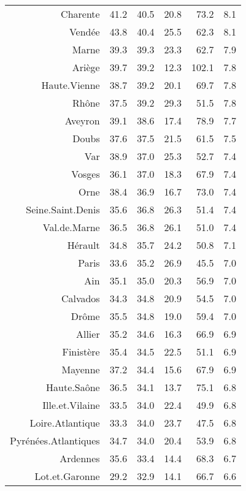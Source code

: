 \documentclass[11pt,a4paper]{article}\usepackage[]{graphicx}\usepackage[]{color}
\begin{document}
\begin{table}[H]
\begin{tabular}{rrrrrr}
  Charente & 41.2 & 40.5 & 20.8 & 73.2 & 8.1 \\ 
  Vendée & 43.8 & 40.4 & 25.5 & 62.3 & 8.1 \\ 
  Marne & 39.3 & 39.3 & 23.3 & 62.7 & 7.9 \\ 
  Ariège & 39.7 & 39.2 & 12.3 & 102.1 & 7.8 \\ 
  Haute.Vienne & 38.7 & 39.2 & 20.1 & 69.7 & 7.8 \\ 
  Rhône & 37.5 & 39.2 & 29.3 & 51.5 & 7.8 \\ 
  Aveyron & 39.1 & 38.6 & 17.4 & 78.9 & 7.7 \\ 
  Doubs & 37.6 & 37.5 & 21.5 & 61.5 & 7.5 \\ 
  Var & 38.9 & 37.0 & 25.3 & 52.7 & 7.4 \\ 
  Vosges & 36.1 & 37.0 & 18.3 & 67.9 & 7.4 \\ 
  Orne & 38.4 & 36.9 & 16.7 & 73.0 & 7.4 \\ 
  Seine.Saint.Denis & 35.6 & 36.8 & 26.3 & 51.4 & 7.4 \\ 
  Val.de.Marne & 36.5 & 36.8 & 26.1 & 51.0 & 7.4 \\ 
  Hérault & 34.8 & 35.7 & 24.2 & 50.8 & 7.1 \\ 
  Paris & 33.6 & 35.2 & 26.9 & 45.5 & 7.0 \\ 
  Ain & 35.1 & 35.0 & 20.3 & 56.9 & 7.0 \\ 
  Calvados & 34.3 & 34.8 & 20.9 & 54.5 & 7.0 \\ 
  Drôme & 35.5 & 34.8 & 19.0 & 59.4 & 7.0 \\ 
  Allier & 35.2 & 34.6 & 16.3 & 66.9 & 6.9 \\ 
  Finistère & 35.4 & 34.5 & 22.5 & 51.1 & 6.9 \\ 
  Mayenne & 37.2 & 34.4 & 15.6 & 67.9 & 6.9 \\ 
  Haute.Saône & 36.5 & 34.1 & 13.7 & 75.1 & 6.8 \\ 
  Ille.et.Vilaine & 33.5 & 34.0 & 22.4 & 49.9 & 6.8 \\ 
  Loire.Atlantique & 33.3 & 34.0 & 23.7 & 47.5 & 6.8 \\ 
  Pyrénées.Atlantiques & 34.7 & 34.0 & 20.4 & 53.9 & 6.8 \\ 
  Ardennes & 35.6 & 33.4 & 14.4 & 68.3 & 6.7 \\ 
  Lot.et.Garonne & 29.2 & 32.9 & 14.1 & 66.7 & 6.6 \\ 
   \hline
\end{tabular}
\end{table}
\end{document}
